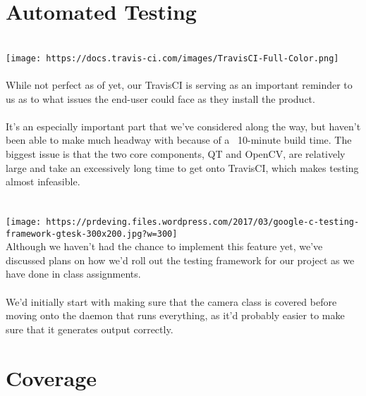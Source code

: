 \documentclass[12pt]{article}
\begin{document}
\section*{Automated Testing}
\\\texttt{[image: https://docs.travis-ci.com/images/TravisCI-Full-Color.png]}
\\
\\
While not perfect as of yet, our TravisCI is serving as an important reminder to us as to what issues the end-user could face as they install the product. 
\\
\\It's an especially important part that we've considered along the way, but haven't been able to make much headway with because of a ~10-minute build time. The biggest issue is that the two core components, QT and OpenCV, are relatively large and take an excessively long time to get onto TravisCI, which makes testing almost infeasible.
\\
\\
\\\texttt{[image: https://prdeving.files.wordpress.com/2017/03/google-c-testing-framework-gtesk-300x200.jpg?w=300]}
\\Although we haven't had the chance to implement this feature yet, we've discussed plans on how we'd roll out the testing framework for our project as we have done in class assignments. 
\\
\\We'd initially start with making sure that the camera class is covered before moving onto the daemon that runs everything, as it'd probably easier to make sure that it generates output correctly.
\pagebreak

\section*{Coverage}
\pagebreak
\end{document}
